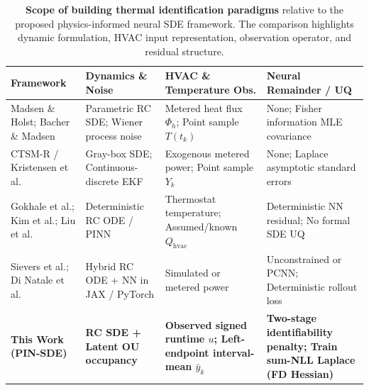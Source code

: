 \documentclass[11pt,letterpaper]{article}
\begin{document}
\begin{table}[t]
\caption{\textbf{Scope of building thermal identification paradigms} relative to the proposed physics-informed neural SDE framework. The comparison highlights dynamic formulation, HVAC input representation, observation operator, and residual structure.}
\label{tab:prior}
\centering
\small
\begin{tabular}{@{}p{}p{}p{}p{}@{}}
\toprule
\textbf{Framework} & \textbf{Dynamics \& Noise} & \textbf{HVAC \& Temperature Obs.} & \textbf{Neural Remainder / UQ} \\
\midrule
Madsen \& Holst; Bacher \& Madsen~\cite{madsen1995,bacher2011} & Parametric RC SDE; Wiener process noise & Metered heat flux $\Phi_h$; Point sample $T(t_k)$ & None; Fisher information MLE covariance \\
CTSM-R / Kristensen et al.~\cite{kristensen2004} & Gray-box SDE; Continuous-discrete EKF & Exogenous metered power; Point sample $Y_k$ & None; Laplace asymptotic standard errors \\
Gokhale et al.; Kim et al.; Liu et al.~\cite{gokhale2022,kim2025,liu2025etp} & Deterministic RC ODE / PINN & Thermostat temperature; Assumed/known $Q_\mathrm{hvac}$ & Deterministic NN residual; No formal SDE UQ \\
Sievers et al.; Di Natale et al.~\cite{sievers2023,dinatale2022} & Hybrid RC ODE + NN in JAX / PyTorch & Simulated or metered power & Unconstrained or PCNN; Deterministic rollout loss \\
\textbf{This Work (PIN-SDE)} & \textbf{RC SDE + Latent OU occupancy} & \textbf{Observed signed runtime $u$; Left-endpoint interval-mean $\bar{y}_k$} & \textbf{Two-stage identifiability penalty; Train sum-NLL Laplace (FD Hessian)} \\
\bottomrule
\end{tabular}
\end{table}
\end{document}
